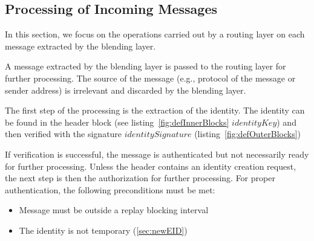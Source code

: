 

\subsection{Processing of Incoming Messages}\label{sec:processingIncommingMessages}
In this section, we focus on the operations carried out by a routing layer on each message extracted by the blending layer. 

A message extracted by the blending layer is passed to the routing layer for further processing. The source of the message (e.g., protocol of the message or sender address) is irrelevant and discarded by the blending layer. 

The first step of the processing is the extraction of the identity. The identity can be found in the header block (see listing~\ref{fig:defInnerBlocks} $identityKey$) and then verified with the signature $identitySignature$ (listing~\ref{fig:defOuterBlocks})

\begin{lstfloat}[ht]
	
	\caption{Definition of the inner message blocks.}
	\label{fig:defInnerBlocks}
\end{lstfloat}

If verification is successful, the message is authenticated but not necessarily ready for further processing. Unless the header contains an identity creation request, the next step is then the authorization for further processing. For proper authentication, the following preconditions must be met:
\begin{itemize}
	\item Message must be outside a replay blocking interval
	\item The identity is not temporary (\cref{sec:newEID})
\end{itemize}

